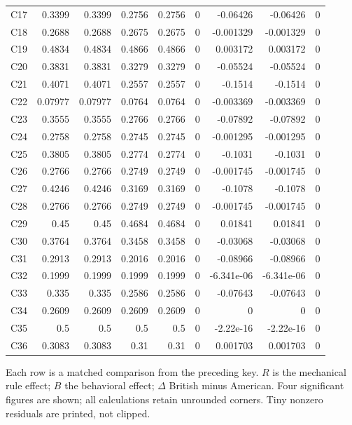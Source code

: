 \documentclass[10pt]{article}
\begin{document}
\begin{longtable}{@{}lrrrrrrrr@{}}
C17 & 0.3399 & 0.3399 & 0.2756 & 0.2756 & 0 & -0.06426 & -0.06426 & 0\\[1pt]
C18 & 0.2688 & 0.2688 & 0.2675 & 0.2675 & 0 & -0.001329 & -0.001329 & 0\\[1pt]
C19 & 0.4834 & 0.4834 & 0.4866 & 0.4866 & 0 & 0.003172 & 0.003172 & 0\\[1pt]
C20 & 0.3831 & 0.3831 & 0.3279 & 0.3279 & 0 & -0.05524 & -0.05524 & 0\\[1pt]
C21 & 0.4071 & 0.4071 & 0.2557 & 0.2557 & 0 & -0.1514 & -0.1514 & 0\\[1pt]
C22 & 0.07977 & 0.07977 & 0.0764 & 0.0764 & 0 & -0.003369 & -0.003369 & 0\\[1pt]
C23 & 0.3555 & 0.3555 & 0.2766 & 0.2766 & 0 & -0.07892 & -0.07892 & 0\\[1pt]
C24 & 0.2758 & 0.2758 & 0.2745 & 0.2745 & 0 & -0.001295 & -0.001295 & 0\\[1pt]
C25 & 0.3805 & 0.3805 & 0.2774 & 0.2774 & 0 & -0.1031 & -0.1031 & 0\\[1pt]
C26 & 0.2766 & 0.2766 & 0.2749 & 0.2749 & 0 & -0.001745 & -0.001745 & 0\\[1pt]
C27 & 0.4246 & 0.4246 & 0.3169 & 0.3169 & 0 & -0.1078 & -0.1078 & 0\\[1pt]
C28 & 0.2766 & 0.2766 & 0.2749 & 0.2749 & 0 & -0.001745 & -0.001745 & 0\\[1pt]
C29 & 0.45 & 0.45 & 0.4684 & 0.4684 & 0 & 0.01841 & 0.01841 & 0\\[1pt]
C30 & 0.3764 & 0.3764 & 0.3458 & 0.3458 & 0 & -0.03068 & -0.03068 & 0\\[1pt]
C31 & 0.2913 & 0.2913 & 0.2016 & 0.2016 & 0 & -0.08966 & -0.08966 & 0\\[1pt]
C32 & 0.1999 & 0.1999 & 0.1999 & 0.1999 & 0 & -6.341e-06 & -6.341e-06 & 0\\[1pt]
C33 & 0.335 & 0.335 & 0.2586 & 0.2586 & 0 & -0.07643 & -0.07643 & 0\\[1pt]
C34 & 0.2609 & 0.2609 & 0.2609 & 0.2609 & 0 & 0 & 0 & 0\\[1pt]
C35 & 0.5 & 0.5 & 0.5 & 0.5 & 0 & -2.22e-16 & -2.22e-16 & 0\\[1pt]
C36 & 0.3083 & 0.3083 & 0.31 & 0.31 & 0 & 0.001703 & 0.001703 & 0\\[1pt]
\end{longtable}\normalsize
{}\par\medskip
Each row is a matched comparison from the preceding key. $R$ is the mechanical rule effect; $B$ the behavioral effect; $\Delta$ British minus American. Four significant figures are shown; all calculations retain unrounded corners. Tiny nonzero residuals are printed, not clipped.\par\medskip
\end{document}
